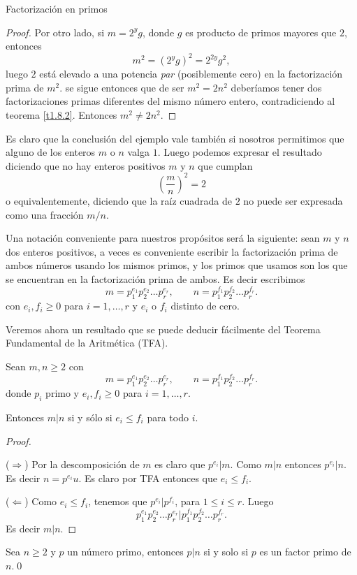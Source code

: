 \begin{section}{Factorización en primos}
\begin{proof}
Por otro lado, si $m=2^yg$, donde $g$ es producto de primos mayores que $2$, entonces
$$
m^2= (2^yg)^2 = 2^{2y}g^2,
$$
luego $2$ está elevado a una potencia \textit{par} (posiblemente cero) en la factorización prima de $m^2$. se sigue entonces que de ser $m^2 = 2n^2$ deberíamos tener dos factorizaciones primas diferentes del mismo número entero, contradiciendo al teorema \ref{t1.8.2}. Entonces $m^2 \not= 2n^2$.
\end{proof}

Es claro que la conclusión del ejemplo  vale también si nosotros permitimos que alguno de los enteros $m$ o $n$ valga $1$. Luego podemos expresar el resultado diciendo que no hay enteros positivos $m$ y $n$ que cumplan 
$$
\left(\frac{m}{n}\right)^2 =2
$$
o equivalentemente, diciendo que la raíz cuadrada de $2$ no puede ser expresada como una fracción $m/n$.

Una notación conveniente para nuestros propósitos será la siguiente: sean $m$ y $n$ dos enteros positivos, a veces es conveniente escribir la factorización prima de ambos números usando los mismos primos, y los primos que usamos son los que se encuentran en la factorización prima de ambos. Es decir  escribimos
$$
m=p_1^{e_1}p_2^{e_2}\ldots p_r^{e_r},\qquad
n=p_1^{f_1}p_2^{f_2}\ldots p_r^{f_r}.
$$
con $e_i,f_i \ge 0$ para $i=1,\ldots,r$ y $e_i$ o $f_i$ distinto de cero. 
 
Veremos ahora un resultado que se puede deducir fácilmente del Teorema Fundamental de la Aritmética (TFA).

\begin{proposicion} Sean $m,n \ge2$ con
$$
m=p_1^{e_1}p_2^{e_2}\ldots p_r^{e_r},\qquad
n=p_1^{f_1}p_2^{f_2}\ldots p_r^{f_r}.
$$
donde $p_i$ primo y $e_i,f_i \ge 0$ para $i=1,\ldots,r$. 

Entonces $m|n$ si y sólo si $e_i \le f_i$ para todo $i$.
\end{proposicion}
\begin{proof}
\
    
\noindent($\Rightarrow$) Por la descomposición de $m$ es claro que $p^{e_i}|m$. Como $m|n$ entonces   $p^{e_i}|n$. Es decir $n =  p^{e_i}u$. Es claro por TFA entonces que $e_i \le f_i$.

\noindent($\Leftarrow$) Como $e_i \le f_i$, tenemos que $p^{e_i}|p^{f_i}$, para $1 \le i \le r$.  Luego  $$p_1^{e_1}p_2^{e_2}\ldots p_r^{e_r}| p_1^{f_1}p_2^{f_2}\ldots p_r^{f_r}.$$ Es decir $m|n$.
\end{proof}

\begin{corolario}
    Sea $n \ge 2$ y $p$ un número primo,  entonces $p|n$ si y solo si $p$ es un factor primo de $n$.\qed
\end{corolario}




\end{section}
